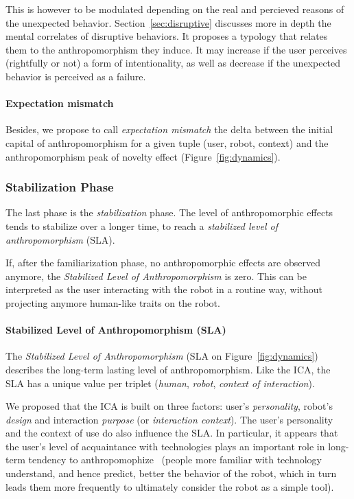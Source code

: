 \documentclass{frontiersSCNS} %
\begin{document}
This is however to be modulated depending on the real and percieved reasons of the
unexpected behavior.  Section~\ref{sec:disruptive} discusses more in depth the
mental correlates of disruptive behaviors. It proposes a typology that relates
them to the anthropomorphism they induce. It may increase if the user perceives
(rightfully or not) a form of intentionality, as well as decrease if the
unexpected behavior is perceived as a failure.

\paragraph{Expectation mismatch}

Besides, we propose to call \emph{expectation mismatch} the delta between the
initial capital of anthropomorphism for a given tuple (user, robot, context)
and the anthropomorphism peak of novelty effect (Figure~\ref{fig:dynamics}).

\subsubsection{Stabilization Phase}
\label{sec:stabilization}

The last phase is the \emph{stabilization} phase. The level of anthropomorphic
effects tends to stabilize over a longer time, to reach a \emph{stabilized
level of anthropomorphism} (SLA).

If, after the familiarization phase, no anthropomorphic effects are observed
anymore, the \emph{Stabilized Level of Anthropomorphism} is zero. This can
be interpreted as the user interacting with the robot in a routine way, without
projecting anymore human-like traits on the robot.


\paragraph{Stabilized Level of Anthropomorphism (SLA)}

The \emph{Stabilized Level of Anthropomorphism} (SLA on
Figure~\ref{fig:dynamics}) describes the long-term lasting level of
anthropomorphism.  Like the ICA, the SLA has a unique value per triplet
(\emph{human}, \emph{robot}, \emph{context of interaction}).

We proposed that the ICA is built on three factors: user's \emph{personality},
robot's \emph{design} and interaction \emph{purpose} (or \emph{interaction
context}). The user's personality and the context of use do also influence the
SLA. In particular, it appears that the user's level of acquaintance with
technologies plays an important role in long-term tendency to
anthropomophize~\cite{fink_living_2013} (people more familiar with technology
understand, and hence predict, better the behavior of the robot, which in turn
leads them more frequently to ultimately consider the robot as a simple tool).
\end{document}
